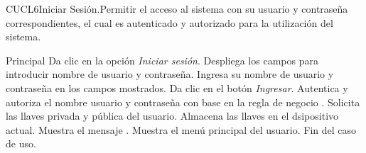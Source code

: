 
\begin{UseCase}{CUCL6}{Iniciar Sesión.}{Permitir el acceso al sistema con su usuario y contraseña correspondientes, el cual es autenticado y autorizado para la utilización del sistema.
	}
\end{UseCase}


\begin{UCtrayectoria}{Principal}
	\UCpaso[\UCactor] Da clic en la opción \textit{Iniciar sesión}.
	\UCpaso Despliega los campos para introducir nombre de usuario y contraseña.
	\UCpaso[\UCactor] Ingresa su nombre de usuario y contraseña en los campos mostrados. \label{CUCL6Regresa}  
	\UCpaso[\UCactor] Da clic en el botón \textit{Ingresar}.
	\UCpaso Autentica y autoriza el nombre usuario y contraseña con base en la regla de negocio .          
	\UCpaso Solicita las llaves privada y pública del usuario. 
	\UCpaso Almacena las llaves en el dsipositivo actual. 
	\UCpaso Muestra el mensaje . 
	\UCpaso Muestra el menú principal del usuario.
	\UCpaso Fin del caso de uso.
\end{UCtrayectoria}

